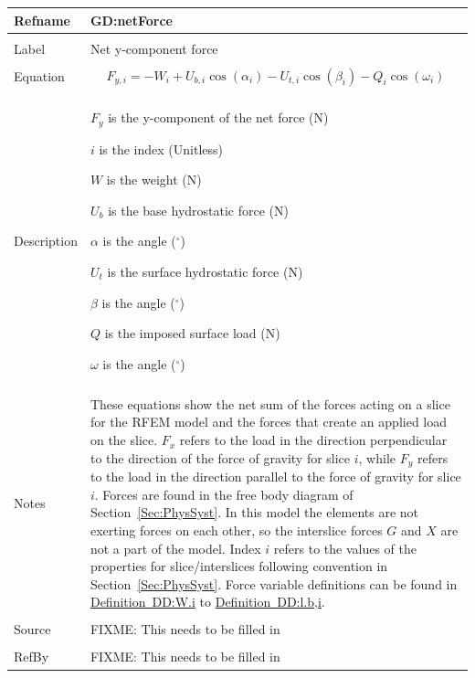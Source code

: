 \documentclass[12pt]{article}
\begin{document}
\noindent \begin{minipage}{\textwidth}
\begin{tabular}{p{} p{}}
\toprule \textbf{Refname} & \textbf{GD:netForce}
\label{GD:netForce}
\\ \midrule \\
Label & Net y-component force
\\ \midrule \\
Equation & \begin{dmath}
           {F_{y,i}}=-W_{i}+{U_{b,i}} \cos\left(α_{i}\right)-{U_{t,i}} \cos\left(β_{i}\right)-Q_{i} \cos\left(ω_{i}\right)
           \end{dmath}
\\ \midrule \\
Description & \begin{symbDescription}
              \item{${F_{y}}$ is the y-component of the net force (N)}
              \item{$i$ is the index (Unitless)}
              \item{$W$ is the weight (N)}
              \item{${U_{b}}$ is the base hydrostatic force (N)}
              \item{$α$ is the angle (${}^{\circ}$)}
              \item{${U_{t}}$ is the surface hydrostatic force (N)}
              \item{$β$ is the angle (${}^{\circ}$)}
              \item{$Q$ is the imposed surface load (N)}
              \item{$ω$ is the angle (${}^{\circ}$)}
              \end{symbDescription}
\\ \midrule \\
Notes & These equations show the net sum of the forces acting on a slice for the RFEM model and the forces that create an applied load on the slice. ${F_{x}}$ refers to the load in the direction perpendicular to the direction of the force of gravity for slice $i$, while ${F_{y}}$ refers to the load in the direction parallel to the force of gravity for slice $i$. Forces are found in the free body diagram of Section~\ref{Sec:PhysSyst}. In this model the elements are not exerting forces on each other, so the interslice forces $G$ and $X$ are not a part of the model. Index $i$ refers to the values of the properties for slice/interslices following convention in Section~\ref{Sec:PhysSyst}. Force variable definitions can be found in \hyperref[DD:W.i]{Definition~DD:W.i} to \hyperref[DD:l.b,i]{Definition~DD:l.b,i}.
\\ \midrule \\
Source & FIXME: This needs to be filled in
\\ \midrule \\
RefBy & FIXME: This needs to be filled in
\\ \bottomrule \end{tabular}
\end{minipage}\\
\end{document}
